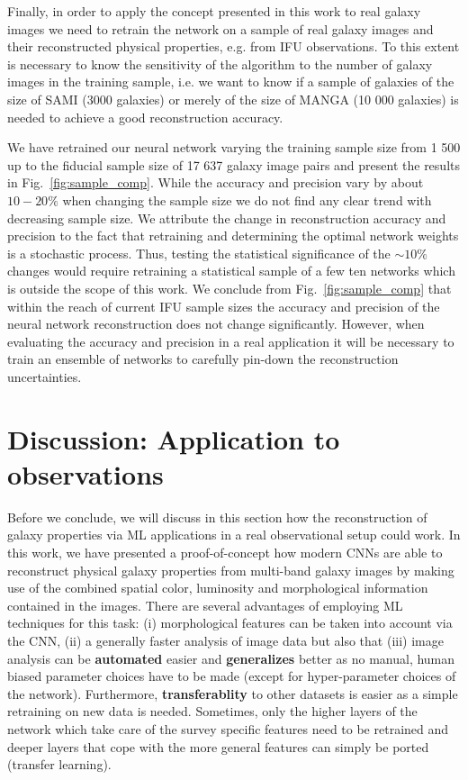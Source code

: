\documentclass[useAMS,usenatbib]{mnras}
\begin{document}
Finally, in order to apply the concept presented in this work to real galaxy images we need to retrain the network on a sample of real galaxy images and their reconstructed physical properties, e.g. from IFU observations. To this extent is necessary to know the sensitivity of the algorithm to the number of galaxy images in the training sample, i.e. we want to know if a sample of galaxies of the size of SAMI (3000 galaxies) or merely of the size of MANGA (10 000 galaxies) is needed to achieve a good reconstruction accuracy.

We have retrained our neural network varying the training sample size from 1 500 up to the fiducial sample size of 17 637 galaxy image pairs and present the results in Fig.~\ref{fig:sample_comp}. While the accuracy and precision vary by about $10-20\%$ when changing the sample size we do not find any clear trend with decreasing sample size. We attribute the change in reconstruction accuracy and precision to the fact that retraining and determining the optimal network weights is a stochastic process. Thus, testing the statistical significance of the $\sim10\%$ changes would require retraining a statistical sample of a few ten networks which is outside the scope of this work.
We conclude from Fig.~\ref{fig:sample_comp} that within the reach of current IFU sample sizes the accuracy and precision of the neural network reconstruction does not change significantly. However, when evaluating the accuracy and precision in a real application it will be necessary to train an ensemble of networks to carefully pin-down the reconstruction uncertainties.


\section{Discussion: Application to observations}
\label{sec:disc}

Before we conclude, we will discuss in this section how the reconstruction of galaxy properties via ML applications in a real observational setup could work.
In this work, we have presented a proof-of-concept how modern CNNs are able to reconstruct physical galaxy properties from multi-band galaxy images by making use of the combined spatial color, luminosity and morphological information contained in the images. There are several advantages of employing ML techniques for this task: (i) morphological features can be taken into account via the CNN, (ii) a generally faster analysis of image data but also that (iii) image analysis can be \textbf{automated} easier and \textbf{generalizes} better as no manual, human biased parameter choices have to be made (except for hyper-parameter choices of the network). Furthermore, \textbf{transferablity} to other datasets is easier as a simple retraining on new data is needed. Sometimes, only the higher layers of the network which take care of the survey specific features need to be retrained and deeper layers that cope with the more general features can simply be ported (transfer learning).
\end{document}
